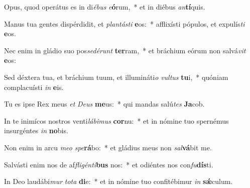 \item Opus, quod operátus es in di\textit{é}\textit{bus} \textit{e}\textbf{ó}rum,~* et in diébus \textit{an}\textbf{tí}quis.
\item Manus tua gentes dispérdidit, et \textit{plan}\textit{tás}\textit{ti} \textbf{e}os:~* afflixísti pópulos, et expulís\textit{ti} \textbf{e}os.
\item Nec enim in gládio suo pos\textit{se}\textit{dé}\textit{runt} \textbf{ter}ram,~* et bráchium eórum non salvá\textit{vit} \textbf{e}os:
\item Sed déxtera tua, et bráchium tuum, et illumináti\textit{o} \textit{vul}\textit{tus} \textbf{tu}i,~* quóniam complacuísti \textit{in} \textbf{e}is.
\item Tu es ipse Rex meus \textit{et} \textit{De}\textit{us} \textbf{me}us:~* qui mandas salú\textit{tes} \textbf{Ja}cob.
\item In te inimícos nostros venti\textit{lá}\textit{bi}\textit{mus} \textbf{cor}nu:~* et in nómine tuo spernémus insurgéntes \textit{in} \textbf{no}bis.
\item Non enim in arcu \textit{me}\textit{o} \textit{spe}\textbf{rá}bo:~* et gládius meus non \textit{sal}\textbf{vá}bit me.
\item Salvásti enim nos de af\textit{fli}\textit{gén}\textit{ti}\textbf{bus} nos:~* et odiéntes nos con\textit{fu}\textbf{dís}ti.
\item In Deo laudábi\textit{mur} \textit{to}\textit{ta} \textbf{di}e:~* et in nómine tuo confitébimur \textit{in} \textbf{sǽ}culum.
